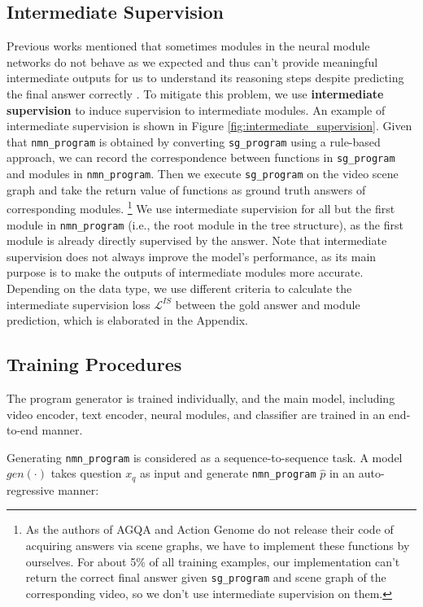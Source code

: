 \documentclass[letterpaper]{article} %
\begin{document}
\subsection{Intermediate Supervision}
Previous works mentioned that sometimes modules in the neural module networks do not behave as we expected and thus can't provide meaningful intermediate outputs for us to understand its reasoning steps despite predicting the final answer correctly \cite{Hu2017LearningTR}. To mitigate this problem, we use \textbf{intermediate supervision} to induce supervision to intermediate modules. An example of intermediate supervision is shown in Figure \ref{fig:intermediate_supervision}.
Given that \texttt{nmn\_program} is obtained by converting \texttt{sg\_program} using a rule-based approach, we can record the correspondence between functions in \texttt{sg\_program} and modules in \texttt{nmn\_program}. Then we execute \texttt{sg\_program} on the video scene graph and take the return value of functions as ground truth answers of corresponding modules. \footnote{As the authors of AGQA and Action Genome do not release their code of acquiring answers via scene graphs, we have to implement these functions by ourselves. For about 5\% of all training examples, our implementation can't return the correct final answer given \texttt{sg\_program} and scene graph of the corresponding video, so we don't use intermediate supervision on them.} We use intermediate supervision for all but the first module in \texttt{nmn\_program} (i.e., the root module in the tree structure), as the first module is already directly supervised by the answer. Note that intermediate supervision does not always improve the model's performance, as its main purpose is to make the outputs of intermediate modules more accurate.
Depending on the data type, we use different criteria to calculate the intermediate supervision loss $\mathcal{L}^{IS}$ between the gold answer and module prediction, which is elaborated in the Appendix.

\subsection{Training Procedures}
The program generator is trained individually, and the main model, including video encoder, text encoder, neural modules, and classifier are trained in an end-to-end manner.

Generating \texttt{nmn\_program} is considered as a sequence-to-sequence task. A model $gen(\cdot)$ takes question $x_q$ as input and generate \texttt{nmn\_program} $\hat{p}$ in an auto-regressive manner:
\end{document}
